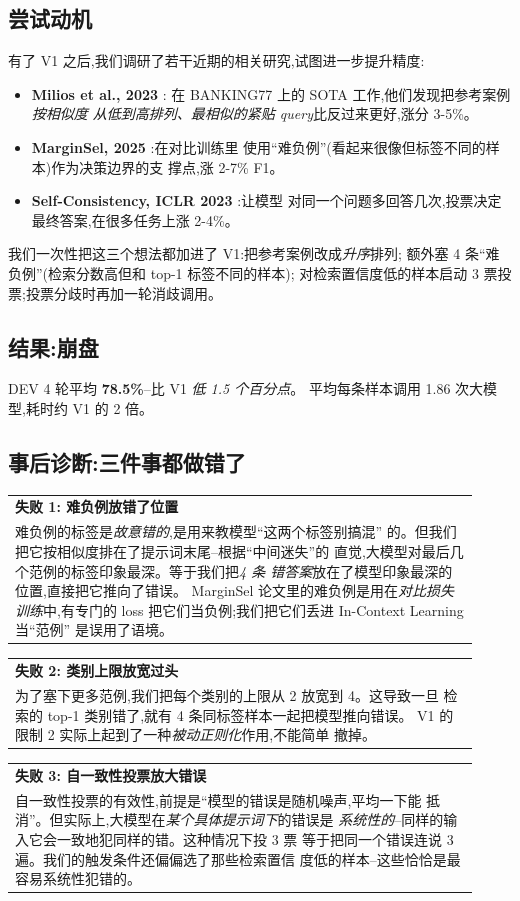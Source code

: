\documentclass[10pt,twocolumn,letterpaper]{article}
\makeatletter
\newcommand{\failbox}[2][\textbf{失败案例}]{%
  \par\medskip\noindent
  \begin{tabular}{@{}|@{\hspace{4pt}}p{0.92\linewidth}@{\hspace{4pt}}|@{}}
  \hline
  \rule{0pt}{2.6ex}\textbf{\color{failclr}#1}\\[2pt]
  \small #2 \\[2pt]
  \hline
  \end{tabular}
  \par\medskip
}
\makeatother
\begin{document}
\subsection{尝试动机}
有了 V1 之后,我们调研了若干近期的相关研究,试图进一步提升精度:
\begin{itemize}[leftmargin=*,itemsep=2pt,topsep=2pt]
\item \textbf{Milios et al., 2023} \cite{milios2023icl}:
  在 BANKING77 上的 SOTA 工作,他们发现把参考案例\emph{按相似度
  从低到高排列、最相似的紧贴 query}比反过来更好,涨分 3-5\%。
\item \textbf{MarginSel, 2025} \cite{marginsel2025}:在对比训练里
  使用``难负例''(看起来很像但标签不同的样本)作为决策边界的支
  撑点,涨 2-7\% F1。
\item \textbf{Self-Consistency, ICLR 2023} \cite{wang2023sc}:让模型
  对同一个问题多回答几次,投票决定最终答案,在很多任务上涨 2-4\%。
\end{itemize}
我们一次性把这三个想法都加进了 V1:把参考案例改成\emph{升序}排列;
额外塞 4 条``难负例''(检索分数高但和 top-1 标签不同的样本);
对检索置信度低的样本启动 3 票投票;投票分歧时再加一轮消歧调用。

\subsection{结果:崩盘}
DEV 4 轮平均 \textbf{78.5\%}--比 V1 \emph{低 1.5 个百分点}。
平均每条样本调用 1.86 次大模型,耗时约 V1 的 2 倍。

\subsection{事后诊断:三件事都做错了}

\failbox[\textbf{失败 1: 难负例放错了位置}]{%
难负例的标签是\emph{故意错的},是用来教模型``这两个标签别搞混''
的。但我们把它按相似度排在了提示词末尾--根据``中间迷失''的
直觉,大模型对最后几个范例的标签印象最深。等于我们把\emph{4 条
错答案}放在了模型印象最深的位置,直接把它推向了错误。
MarginSel 论文里的难负例是用在\emph{对比损失训练}中,有专门的
loss 把它们当负例;我们把它们丢进 In-Context Learning 当``范例''
是误用了语境。
}

\failbox[\textbf{失败 2: 类别上限放宽过头}]{%
为了塞下更多范例,我们把每个类别的上限从 2 放宽到 4。这导致一旦
检索的 top-1 类别错了,就有 4 条同标签样本一起把模型推向错误。
V1 的限制 2 实际上起到了一种\emph{被动正则化}作用,不能简单
撤掉。
}

\failbox[\textbf{失败 3: 自一致性投票放大错误}]{%
自一致性投票的有效性,前提是``模型的错误是随机噪声,平均一下能
抵消''。但实际上,大模型在\emph{某个具体提示词下}的错误是\emph{
系统性的}--同样的输入它会一致地犯同样的错。这种情况下投 3 票
等于把同一个错误连说 3 遍。我们的触发条件还偏偏选了那些检索置信
度低的样本--这些恰恰是最容易系统性犯错的。
}
\end{document}
